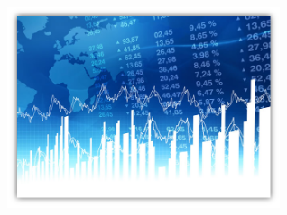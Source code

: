 \begin{titlepage}

\begin{center}



~\vspace*{5mm}

\begin{minipage}[t]{0.48\textwidth}
  \begin{flushleft}
    \centering \includegraphics [width=8cm]{images/presentation3.png} \\[0.5cm]
    \begin{spacing}{1.5}
    \end{spacing}
  \end{flushleft}
\end{minipage}

~\vspace*{12mm}

\textsc{\Large \reportsubject}\\[0.5cm]
\HRule \\[0.4cm]
{\huge \bfseries \reporttitle}\\[0.4cm]
\HRule \\[1.5cm]


\end{center}
\end{titlepage}
